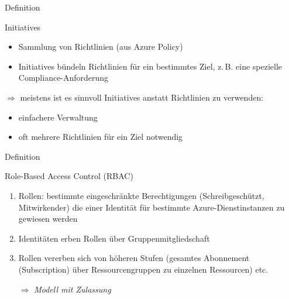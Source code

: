 \documentclass{scrartcl}
\newenvironment{flashcard}[2][]{%
    #1
    \vfill
    \centerline{\Large{#2}}
    \vfill
\newpage
}
{\newpage}
\begin{document}
    \begin{flashcard}[Definition]{Initiatives}
        \begin{itemize}
            \item Sammlung von Richtlinien (aus Azure Policy)
            \item Initiatives bündeln Richtlinien für ein bestimmtes Ziel, z.\,B. eine spezielle Compliance-Anforderung
        \end{itemize}
        
        \vspace{5mm}
        $\Rightarrow$ meistens ist es sinnvoll Initiatives anstatt Richtlinien zu verwenden:
        \begin{itemize}
            \item einfachere Verwaltung
            \item oft mehrere Richtlinien für ein Ziel notwendig
        \end{itemize}

    \end{flashcard}

    \begin{flashcard}[Definition]{Role-Based Access Control (RBAC)}
        \begin{enumerate}
            \item Rollen: bestimmte eingeschränkte Berechtigungen (Schreibgeschützt, Mitwirkender) die einer Identität für bestimmte Azure-Dienstinstanzen zu gewiesen werden
            \item Identitäten erben Rollen über Gruppenmitgliedschaft
            \item Rollen vererben sich von höheren Stufen (gesamtes Abonnement (Subscription) über Ressourcengruppen zu einzelnen Ressourcen) etc.
            \item[$\Rightarrow$] \emph{Modell mit Zulassung}
        \end{enumerate}
    \end{flashcard}
\end{document}
